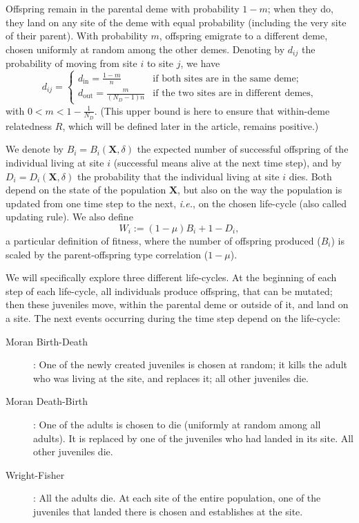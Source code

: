 \documentclass[11pt, letterpaper]{article}
\newcommand{\ie}{\textit{i.e.}}
\newcommand{\inn}{\textrm{in}}
\newcommand{\out}{\textrm{out}}
\newcommand{\din}{d_{\inn}}
\newcommand{\dout}{d_{\out}}
\newcommand{\ndemes}{N_D}
\newcommand{\selstr}{\delta}
\begin{document}
Offspring remain in the parental deme with probability $1-m$; when they do, they land on any site of the deme with equal probability (including the very site of their parent). With probability $m$, offspring emigrate to a different deme, chosen uniformly at random among the other demes. Denoting by $d_{ij}$ the probability of moving from site $i$ to site $j$, we have
\begin{equation}\label{eq:defD}
d_{ij} = \begin{cases}
 \din =  \frac{1-m}{n} & \textrm{if both sites are in the same deme;}\\
 \dout = \frac{m}{(\ndemes-1) n} & \textrm{if the two sites are in different demes,} 
\end{cases}
\end{equation}
%
with $0 < m < 1-\frac{1}{\ndemes}$. (This upper bound is here to ensure that within-deme relatedness $R$, which will be defined later in the article, remains positive.)

We denote by $B_i = B_i(\mathbf{X}, \selstr)$ the expected number of successful offspring of the individual living at site $i$ (successful means alive at the next time step), and by $D_i = D_i(\mathbf{X}, \selstr)$ the probability that the individual living at site $i$ dies. Both depend on the state of the population $\mathbf{X}$, but also on the way the population is updated from one time step to the next, \ie, on the chosen life-cycle (also called updating rule). We also define
%
\begin{equation}\label{eq:defW}
W_i := (1-\mu) B_i + 1 - D_i,
\end{equation}
a particular definition of fitness, where the number of offspring produced ($B_i$) is scaled by the parent-offspring type correlation ($1-\mu$).

We will specifically explore three different life-cycles. At the beginning of each step of each life-cycle, all individuals produce offspring, that can be mutated; then these juveniles move, within the parental deme or outside of it, and land on a site. The next events occurring during the time step depend on the life-cycle:
\begin{description}
\item[Moran Birth-Death]: One of the newly created juveniles is chosen at random; it kills the adult who was living at the site, and replaces it; all other juveniles die. 
\item[Moran Death-Birth]: One of the adults is chosen to die (uniformly at random among all adults). It is replaced by one of the juveniles who had landed in its site. All other juveniles die. 
\item[Wright-Fisher]: All the adults die. At each site of the entire population, one of the juveniles that landed there is chosen and establishes at the site. 
\end{description}
  
\end{document}
